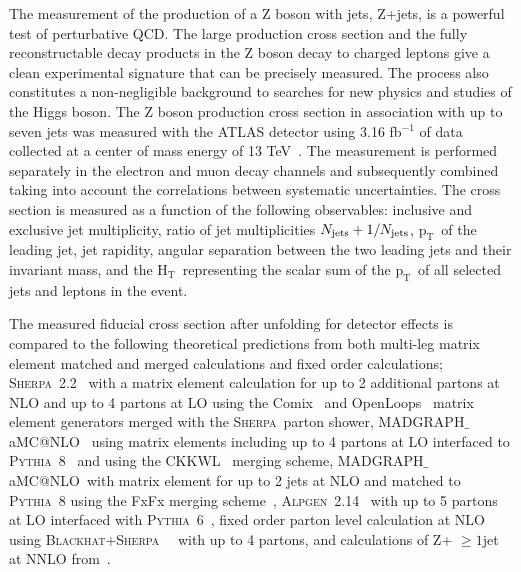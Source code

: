 \documentclass[a4paper,11pt,notoc]{article}
\makeatletter
\newcommand{\pt}{\ensuremath{\mathrm{p_T}}}
\newcommand{\Ht}{\ensuremath{\mathrm{H_T}}}
\newcommand{\PYTHIA}{\textsc{Pythia}}
\newcommand{\SHERPA}{\textsc{Sherpa}}
\newcommand{\BLACKHAT}{\textsc{Blackhat}}
\newcommand{\ALPGEN}{\textsc{Alpgen}}
\newcommand{\MGNLO}{MADGRAPH$\_$aMC@NLO}
\makeatother
\begin{document}
The measurement of the production of a Z boson with jets, Z+jets, is a powerful test of perturbative QCD. The large production cross section and the fully reconstructable decay products in the Z boson decay to charged leptons give a clean experimental signature that can be precisely measured. The process also constitutes a non-negligible background to searches for new physics and studies of the Higgs boson.
The Z boson production cross section in association with up to seven jets was measured with the ATLAS detector using 3.16 fb$^{-1}$ of data collected at a center of mass energy of 13 TeV~\cite{Aaboud:2017hbk}. The measurement is performed separately in the electron and muon decay channels and subsequently combined taking into account the correlations between systematic uncertainties. The cross section is measured as a function of the following observables: inclusive and exclusive jet multiplicity, ratio of jet multiplicities $N_{\rm jets}+1/N_{\rm jets}$, \pt\ of the leading jet, jet rapidity, angular separation between the two leading jets and their invariant mass, and the \Ht\, representing the scalar sum of the \pt\ of all selected jets and leptons in the event. 

The measured fiducial cross section after unfolding for detector effects is compared to the following theoretical predictions from both multi-leg matrix element matched and merged calculations and fixed order calculations; \SHERPA\ 2.2~\cite{Gleisberg:2008ta} with a matrix element calculation for up to 2 additional partons at NLO and up to 4 partons at LO using the Comix~\cite{Gleisberg:2008fv} and OpenLoops~\cite{Cascioli:2011va} matrix element generators merged with the \SHERPA\ parton shower, \MGNLO~\cite{Alwall:2014hca} using matrix elements including up to 4 partons at LO interfaced to \PYTHIA\ 8~\cite{Sjostrand:2007gs} and using the CKKWL~\cite{Lonnblad:2001iq} merging scheme, \MGNLO\ with matrix element for up to 2 jets at NLO and matched to \PYTHIA\ 8 using the FxFx merging scheme~\cite{Frederix:2012ps}, \ALPGEN\ 2.14~\cite{Mangano:2002ea} with up to 5 partons at LO interfaced with \PYTHIA\ 6~\cite{Sjostrand:2006za}, fixed order parton level calculation at NLO using \BLACKHAT+\SHERPA~\cite{Berger:2010vm}~\cite{Ita:2011wn} with up to 4 partons, and calculations of Z+ $\ge 1$jet at NNLO from~\cite{Boughezal:2015dva}. 
\end{document}
